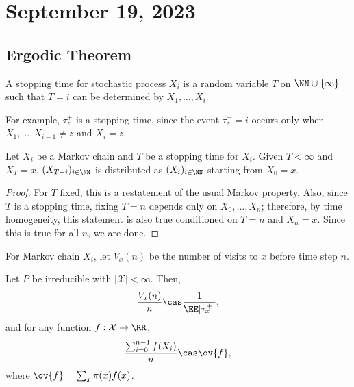 \section{September 19, 2023}

\subsection{Ergodic Theorem}

\begin{definition}

A \ac{stopping time} for stochastic process $X_i$ is a random variable $T$ on $\NN\cup \{\infty\}$ such that $T=i$ can be determined by $X_1, \hdots, X_i$. 
\end{definition}

For example, $\tau_z^+$ is a stopping time, since the event $\tau_z^+=i$ occurs only when $X_1, \hdots, X_{i-1}\neq z$ and $X_i = z$. 

\begin{theorem}

Let $X_i$ be a Markov chain and $T$ be a stopping time for $X_i$. Given $T<\infty$ and $X_T=x$, $(X_{T+i})_{i\in \NN}$ is distributed as $(X_i)_{i\in \NN}$ starting from $X_0=x$.
\end{theorem}

\begin{proof}
For $T$ fixed, this is a restatement of the usual Markov property. Also, since $T$ is a stopping time, fixing $T=n$ depends only on $X_0, \hdots, X_{n}$; therefore, by time homogeneity, this statement is also true conditioned on $T=n$ and $X_n=x$. Since this is true for all $n$, we are done. 
\end{proof}

For Markov chain $X_i$, let $V_x(n)$ be the number of visits to $x$ before time step $n$. 

\begin{theorem}

Let $P$ be irreducible with $\vert \mathcal{X}\vert < \infty$. Then, 
\[\frac{V_x(n)}{n}\cas \frac{1}{\EE[\tau_x^+]},\]
and for any function $f: \mathcal{X}\rightarrow \RR$, 
\[\frac{\sum_{i=0}^{n-1}f(X_i)}{n}\cas \ov{f},\]
where $\ov{f} = \sum_x \pi(x)f(x)$.
\end{theorem}




